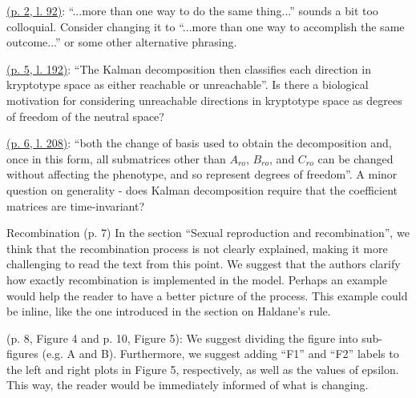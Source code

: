 
\begin{point}{}
  \hyperlink{rev2:2}{(p. 2, l. 92)}: ``...more than one way to do the same thing...'' sounds a bit too colloquial. Consider changing it to ``...more than one way to accomplish the same outcome...'' or some other alternative phrasing.
\end{point}


\begin{point}{}
  \hyperlink{rev2:3}{(p. 5, l. 192)}: ``The Kalman decomposition then classifies each direction in kryptotype space as either reachable or unreachable''. Is there a biological motivation for considering unreachable directions in kryptotype space as degrees of freedom of the neutral space?
\end{point}


\begin{point}{}
\hyperlink{rev2:4}{(p. 6, l. 208)}: ``both the change of basis used to obtain the decomposition and, once in this form, all submatrices other than $A_{ro}$, $B_{ro}$, and $C_{ro}$ can be changed without affecting the phenotype, and so represent degrees of freedom''. A minor question on generality - does Kalman decomposition require that the coefficient matrices are time-invariant?
\end{point}


\begin{point}{Recombination}
(p. 7) In the section ``Sexual reproduction and recombination'', we think that the recombination process is not clearly explained, making it more challenging to read the text from this point. We suggest that the authors clarify how exactly recombination is implemented in the model. Perhaps an example would help the reader to have a better picture of the process. This example could be inline, like the one introduced in the section on Haldane's rule.
\end{point}


\begin{point}{}
(p. 8, Figure 4 and p. 10, Figure 5): We suggest dividing the figure into sub-figures (e.g. A and B). Furthermore, we suggest adding ``F1'' and ``F2'' labels to the left and right plots in Figure 5, respectively, as well as the values of epsilon. This way, the reader would be immediately informed of what is changing.
\end{point}


